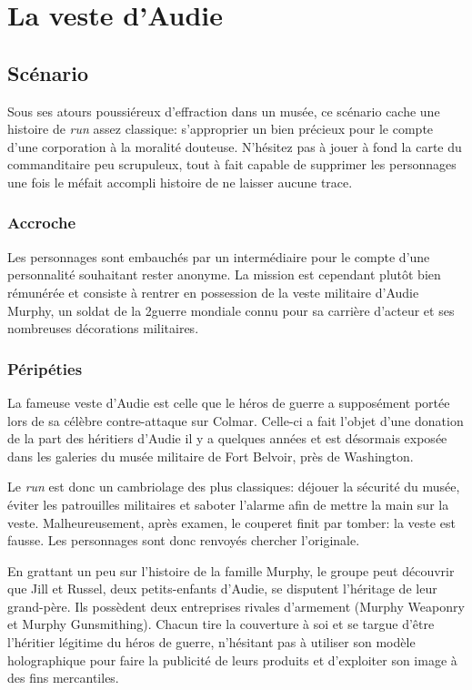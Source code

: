 \chapter{La veste d'Audie}

\section{Scénario}

Sous ses atours poussiéreux d'effraction dans un musée, ce scénario cache une histoire de \emph{run} assez classique: s'approprier un bien précieux pour le compte d'une corporation à la moralité douteuse.
N'hésitez pas à jouer à fond la carte du commanditaire peu scrupuleux, tout à fait capable de supprimer les personnages une fois le méfait accompli histoire de ne laisser aucune trace.

\subsection{Accroche}

Les personnages sont embauchés par un intermédiaire pour le compte d'une personnalité souhaitant rester anonyme.
La mission est cependant plutôt bien rémunérée et consiste à rentrer en possession de la veste militaire d'Audie Murphy, un soldat de la 2\ieme guerre mondiale connu pour sa carrière d'acteur et ses nombreuses décorations militaires.

\subsection{Péripéties}

La fameuse veste d'Audie est celle que le héros de guerre a supposément portée lors de sa célèbre contre-attaque sur Colmar.
Celle-ci a fait l'objet d'une donation de la part des héritiers d'Audie il y a quelques années et est désormais exposée dans les galeries du musée militaire de Fort Belvoir, près de Washington.

Le \emph{run} est donc un cambriolage des plus classiques: déjouer la sécurité du musée, éviter les patrouilles militaires et saboter l'alarme afin de mettre la main sur la veste.
Malheureusement, après examen, le couperet finit par tomber: la veste est fausse.
Les personnages sont donc renvoyés chercher l'originale.

En grattant un peu sur l'histoire de la famille Murphy, le groupe peut découvrir que Jill et Russel, deux petits-enfants d'Audie, se disputent l'héritage de leur grand-père. Ils possèdent deux entreprises rivales d'armement (Murphy Weaponry et Murphy Gunsmithing). 
Chacun tire la couverture à soi et se targue d'être l'héritier légitime du héros de guerre, n'hésitant pas à utiliser son modèle holographique pour faire la publicité de leurs produits et d'exploiter son image à des fins mercantiles.

